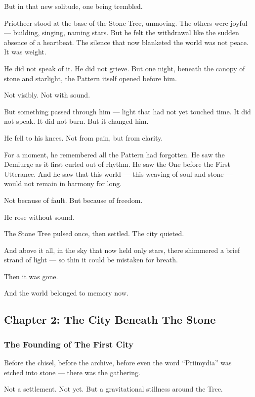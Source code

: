 \documentclass[12pt]{article}
\begin{document}
But in that new solitude, one being trembled.

Priotheer stood at the base of the Stone Tree, unmoving.  
The others were joyful — building, singing, naming stars.  
But he felt the withdrawal like the sudden absence of a heartbeat.  
The silence that now blanketed the world was not peace. It was weight.

He did not speak of it.  
He did not grieve.  
But one night, beneath the canopy of stone and starlight, the Pattern itself opened before him.

Not visibly. Not with sound.

But something passed through him — light that had not yet touched time.  
It did not speak.  
It did not burn.  
But it changed him.

He fell to his knees.  
Not from pain, but from clarity.

For a moment, he remembered all the Pattern had forgotten.  
He saw the Demiurge as it first curled out of rhythm.  
He saw the One before the First Utterance.  
And he saw that this world — this weaving of soul and stone — would not remain in harmony for long.

Not because of fault.  
But because of freedom.

He rose without sound.

The Stone Tree pulsed once, then settled.  
The city quieted.

And above it all, in the sky that now held only stars, there shimmered a brief strand of light — so thin it could be mistaken for breath.

Then it was gone.

And the world belonged to memory now.

\newpage

\subsection*{Chapter 2: The City Beneath The Stone}

\vspace{.5in}

\subsubsection*{The Founding of The First City}

Before the chisel, before the archive, before even the word “Priimydia” was etched into stone — there was the gathering.

Not a settlement. Not yet.  
But a gravitational stillness around the Tree.
\end{document}
